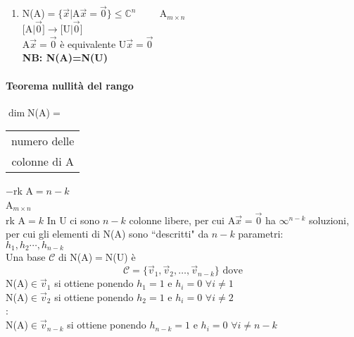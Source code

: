 \begin{enumerate}
        \textbf{NB 1} $\dim$R(A)$=|$D$|=k=\dim$R(U)  \\
        \textbf{NB 2} R(A)$=$R(U) ma non è detto che le H-trasposte delle righe di A corrispondenti alle righe 
        non nulle di U siano una bse: \textbf{occorre prendere le H-trasposte delle righe non nulle di U}
        (Dipende dal fatto che nelle EG su A ci possono essere scambi di righe)
        \textbf{Esempio} A$= 
        \begin{bmatrix}
            0 & 0\\
            1 & i
        \end{bmatrix}
        \underset{E_{12}}{\longrightarrow}
        \begin{bmatrix}
            1 & i\\
            0 & 0
        \end{bmatrix}\footnote{$1$ e $i$ $\vec{s}^T_1$, $0$ $0$ $\vec{0}^T$}
        =$U {\color{purple}PAOLO}\\\\
    \item N(A)$=\{\vec{x}|$A$\vec{x}=\vec{0}\}\leq \mathbb{C}^n\hspace{1cm}$A$_{m\times n}$\\
        $[$A$|\vec{0}]\longrightarrow[$U$|\vec{0}]$\\
        A$\vec{x}=\vec{0}$ è equivalente U$\vec{x}=\vec{0}$\\
        \textbf{NB: N(A)=N(U)}\\
\end{enumerate}

\paragraph{Teorema nullità del rango}
$\dim$N(A)$=$
\begin{tabular}{c}
    numero delle \\
    colonne di A
\end{tabular}
$-$rk A$=n-k$\\
    A$_{m\times n}$\\
    rk A$=k$
    In U ci sono $n-k$ colonne libere, per cui A$\vec{x}=\vec{0}$ ha $\infty^{n-k}$ 
    soluzioni, per cui gli elementi di N(A) sono ``descritti" da $n-k$ parametri: \\
    $h_1, h_2\cdots,h_{n-k}$\\
    Una base $\mathcal{C}$ di N(A)$=$N(U) è
    \[
        \mathcal{C}=\{\vec{v}_1,\vec{v}_2, \dots, \vec{v}_{n-k}\}\textrm{ dove}
    \]
    N(A)$\in\vec{v}_1$ si ottiene ponendo $h_1=1$ e $h_i=0$ $\forall i\neq 1$ \\
    N(A)$\in\vec{v}_2$ si ottiene ponendo $h_2=1$ e $h_i=0$ $\forall i\neq 2$ \\
    :\\
    N(A)$\in\vec{v}_{n-k}$ si ottiene ponendo $h_{n-k}=1$ e $h_i=0$ $\forall i\neq {n-k}$ 
    
